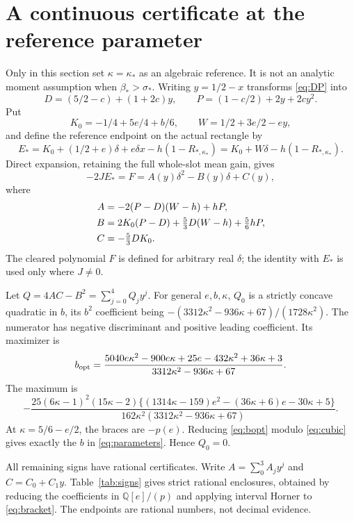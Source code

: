 \documentclass[11pt,a4paper]{article}
\theoremstyle{definition}
\newcommand{\bet}{\beta_*}
\newcommand{\sig}{\sigma_*}
\begin{document}
\section{A continuous certificate at the reference parameter}
\label{sec:certificate}
Only in this section set $\kappa=\kappa_*$ as an algebraic reference.
It is not an analytic moment assumption when $\bet>\sig$.
Writing $y=1/2-x$ transforms \eqref{eq:DP} into
\[
 D=(5/2-c)+(1+2c)y,\qquad
 P=(1-c/2)+2y+2cy^2.
\]
Put
\[
 K_0=-1/4+5e/4+b/6,\qquad W=1/2+3e/2-ey,
\]
and define the reference endpoint on the actual rectangle by
\[
 E_*=K_0+(1/2+e)\delta+e\delta x-h(1-R_{*,\kappa_*})
     =K_0+W\delta-h(1-R_{*,\kappa_*}).
\]
Direct expansion, retaining the full whole-slot mean gain, gives
\begin{equation}\label{eq:F}
 -2JE_*=F=A(y)\delta^2-B(y)\delta+C(y),
\end{equation}
where
\begin{align}
 A&=-2(P-D)(W-h)+hP,\notag\\
 B&=2K_0(P-D)+\tfrac53D(W-h)+\tfrac56hP,\label{eq:ABC}\\
 C&=-\tfrac53DK_0.\notag
\end{align}
The cleared polynomial $F$ is defined for arbitrary real $\delta$;
the identity with $E_*$ is used only where $J\ne0$.

Let $Q=4AC-B^2=\sum_{j=0}^4 Q_jy^j$.
For general $e,b,\kappa$, $Q_0$ is a strictly concave quadratic
in $b$, its $b^2$ coefficient being
$-(3312\kappa^2-936\kappa+67)/(1728\kappa^2)$.
The numerator has negative discriminant and positive leading
coefficient. Its maximizer is
\begin{equation}\label{eq:bopt}
 b_{\rm opt}=
 \frac{5040e\kappa^2-900e\kappa+25e-432\kappa^2+36\kappa+3}
 {3312\kappa^2-936\kappa+67}.
\end{equation}
The maximum is
\[
 -\frac{25(6\kappa-1)^2(15\kappa-2)
 \{(1314\kappa-159)e^2-(36\kappa+6)e-30\kappa+5\}}
 {162\kappa^2(3312\kappa^2-936\kappa+67)} .
\]
At $\kappa=5/6-e/2$, the braces are $-p(e)$.
Reducing \eqref{eq:bopt} modulo \eqref{eq:cubic} gives exactly
the $b$ in \eqref{eq:parameters}. Hence $Q_0=0$.

All remaining signs have rational certificates. Write
$A=\sum_{0}^3 A_jy^j$ and $C=C_0+C_1y$.
Table~\ref{tab:signs} gives strict rational enclosures, obtained
by reducing the coefficients in $\mathbb Q[e]/(p)$ and applying
interval Horner to \eqref{eq:bracket}.
The endpoints are rational numbers, not decimal evidence.
\end{document}
